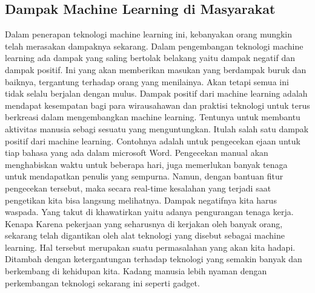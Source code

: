 \subsection{Dampak Machine Learning di Masyarakat}  
Dalam penerapan teknologi machine learning ini, kebanyakan orang mungkin telah merasakan dampaknya sekarang. Dalam pengembangan teknologi machine learning ada dampak yang saling bertolak belakang yaitu dampak negatif dan dampak positif. Ini yang akan memberikan masukan yang berdampak buruk dan baiknya, tergantung terhadap orang yang menilainya. Akan tetapi semua ini tidak selalu berjalan dengan mulus.
Dampak positif dari machine learning adalah mendapat kesempatan bagi para wirausahawan dan praktisi teknologi untuk terus berkreasi dalam mengembangkan machine learning. Tentunya untuk membantu aktivitas manusia sebagi sesuatu yang menguntungkan. Itulah salah satu dampak positif dari machine learning. Contohnya adalah untuk pengecekan ejaan untuk tiap bahasa yang ada dalam microsoft Word.
Pengecekan manual akan menghabiskan waktu untuk beberapa hari, juga memerlukan banyak tenaga untuk mendapatkan penulis yang sempurna. Namun, dengan bantuan fitur pengecekan tersebut, maka secara real-time kesalahan yang terjadi saat pengetikan kita bisa langsung melihatnya.
Dampak negatifnya kita harus waspada. Yang takut di khawatirkan yaitu adanya pengurangan tenaga kerja. Kenapa\? Karena pekerjaan yang seharusnya di kerjakan oleh banyak orang, sekarang telah digantikan oleh alat teknologi yang disebut sebagai machine learning. Hal tersebut merupakan suatu permasalahan yang akan kita hadapi. Ditambah dengan ketergantungan terhadap teknologi yang semakin banyak dan berkembang di kehidupan kita. Kadang manusia lebih nyaman dengan perkembangan teknologi sekarang ini seperti gadget.


